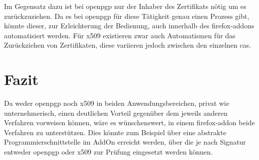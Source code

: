 Im Gegensatz dazu ist bei \gls{openpgp} nur der Inhaber des Zertifikats nötig um es zurückzuziehen. Da es bei \gls{openpgp} für diese Tätigkeit genau einen
Prozess gibt, könnte dieser, zur Erleichterung der Bedienung, auch innerhalb des \glspl{firefox-addon} automatisiert werden. Für \gls{x509} existieren zwar auch
Automatismen für das Zurückziehen von Zertifikaten, diese variieren jedoch zwischen den einzelnen \glspl{ca}.

\section{Fazit}
Da weder \gls{openpgp} noch \gls{x509} in beiden Anwendungsbereichen, privat wie unternehmerisch, einen deutlichen Vorteil gegenüber dem jeweils anderen
Verfahren vorweisen können, wäre es wünschenswert, in einem \gls{firefox-addon} beide Verfahren zu unterstützen. Dies könnte zum Beispiel über eine abstrakte
Programmierschnittstelle im AddOn erreicht werden, über die je nach Signatur entweder \gls{openpgp} oder \gls{x509} zur Prüfung eingesetzt werden können.


